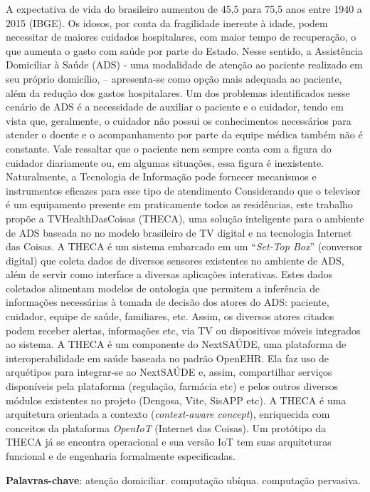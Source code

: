 \setlength{\absparsep}{18pt} %
\begin{resumo}

A expectativa de vida do brasileiro aumentou de 45,5 para 75,5 anos entre 1940 a
2015 (IBGE). Os idosos, por conta da fragilidade inerente à idade, podem
necessitar de maiores cuidados hospitalares, com maior tempo de recuperação, o
que aumenta o gasto com saúde por parte do Estado. Nesse sentido, a Assistência
Domiciliar à Saúde (ADS) - uma modalidade de atenção ao paciente realizado em
seu próprio domicílio, – apresenta-se como opção mais adequada ao paciente, além
da redução dos gastos hospitalares. Um dos problemas identificados nesse
cenário de ADS é a necessidade de auxiliar o paciente e o cuidador, tendo em
vista que, geralmente, o cuidador não possui os conhecimentos necessários para
atender o doente e o acompanhamento por parte da equipe médica também não é 
constante. Vale ressaltar que o paciente nem sempre conta com a figura do
cuidador diariamente ou, em algumas situações, essa figura é inexistente.
Naturalmente, a Tecnologia de Informação pode fornecer mecanismos e instrumentos
eficazes para esse tipo de atendimento Considerando que o televisor é um
equipamento presente em praticamente todos as residências, este trabalho propõe
a TVHealthDasCoisas (THECA), uma solução inteligente para o ambiente de ADS
baseada  no no modelo brasileiro de TV digital e na tecnologia Internet das
Coisas. A THECA é um sistema embarcado em um ``\textit{Set-Top Box}'' (conversor
digital) que coleta dados de diversos sensores existentes no ambiente de ADS,
além de servir como interface a diversas aplicações interativas. Estes dados
coletados alimentam modelos de ontologia que permitem a inferência de
informações necessárias à tomada de decisão dos atores do ADS: paciente,
cuidador, equipe de saúde, familiares, etc. Assim, os diversos atores citados
podem receber alertas, informações etc, via TV ou dispositivos móveis integrados
ao sistema. A THECA é um componente do NextSAÚDE, uma plataforma de
interoperabilidade em saúde baseada no padrão OpenEHR. Ela faz uso de arquétipos
para integrar-se ao NextSAÚDE e, assim, compartilhar serviços disponíveis pela
plataforma (regulação, farmácia etc) e pelos outros diversos módulos existentes
no projeto (Dengosa, Vite, SisAPP etc). A THECA é uma arquitetura orientada a
contexto (\textit{context-aware concept}), enriquecida com conceitos da
plataforma \textit{OpenIoT} (Internet das Coisas). Um protótipo da THECA já se
encontra operacional e sua versão IoT tem suas arquiteturas funcional e de
engenharia formalmente especificadas.

 \textbf{Palavras-chave}: atenção domiciliar. computação ubíqua. computação pervasiva.
 \end{resumo}
